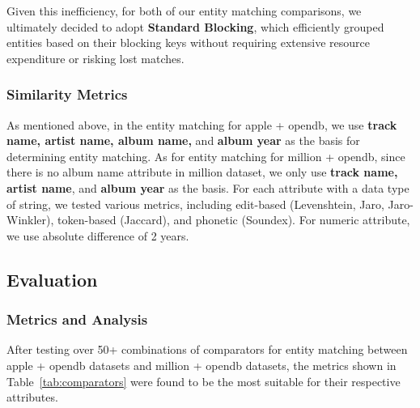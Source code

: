 \documentclass[runningheads]{llncs}
\begin{document}
Given this inefficiency, for both of our entity matching comparisons, we ultimately decided to adopt \textbf{Standard Blocking}, which efficiently grouped entities based on their blocking keys without requiring extensive resource expenditure or risking lost matches.
\subsubsection{Similarity Metrics}
As mentioned above, in the entity matching for apple + opendb, we use \textbf{track name, artist name, album name, }and \textbf{album year} as the basis for determining entity matching. As for entity matching for million + opendb, since there is no album name attribute in million dataset, we only use \textbf{track name, artist name}, and \textbf{album year} as the basis. For each attribute with a data type of string, we tested various metrics, including edit-based (Levenshtein, Jaro, Jaro-Winkler), token-based (Jaccard), and phonetic (Soundex). For numeric attribute, we use absolute difference of 2 years.

\subsection{Evaluation}
\subsubsection{Metrics and Analysis}

After testing over 50+ combinations of comparators for entity matching between apple + opendb datasets and million + opendb datasets, the metrics shown in Table~\ref{tab:comparators} were found to be the most suitable for their respective attributes.
\end{document}
